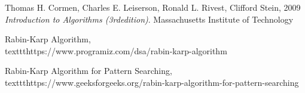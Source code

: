 \documentclass[a4paper,11pt]{article}
\begin{document}
\begin{thebibliography}{99}
Thomas H. Cormen, Charles E. Leiserson, Ronald L. Rivest, Clifford Stein, 
2009
\textit{Introduction to Algorithms (3rdedition)}. 
Massachusetts Institute of Technology

Rabin-Karp Algorithm,
\\texttt{https://www.programiz.com/dsa/rabin-karp-algorithm}

Rabin-Karp Algorithm for Pattern Searching,
\\texttt{https://www.geeksforgeeks.org/rabin-karp-algorithm-for-pattern-searching}
\end{thebibliography}
\end{document}
